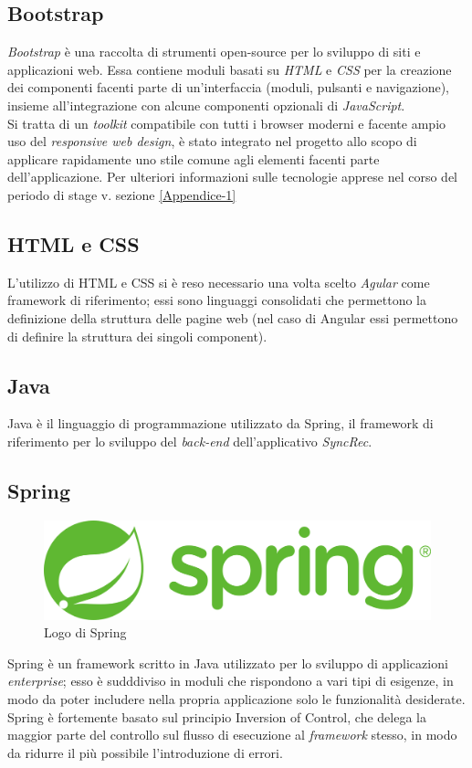 \subsection{Bootstrap}
\textit{Bootstrap} è una raccolta di strumenti \gls{open-source} per lo sviluppo di siti e applicazioni web. Essa contiene moduli basati su \textit{HTML} e \textit{CSS} per la creazione dei componenti facenti parte di un'interfaccia (moduli, pulsanti e navigazione), insieme all'integrazione con alcune componenti opzionali di \textit{JavaScript}.\\
Si tratta di un \textit{toolkit} compatibile con tutti i browser moderni e facente ampio uso del \textit{responsive web design}, è stato integrato nel progetto allo scopo di applicare rapidamente uno stile comune agli elementi facenti parte dell'applicazione.
\bigbreak
\noindent
Per ulteriori informazioni sulle tecnologie apprese nel corso del periodo di stage v. sezione \ref{Appendice-1}


\subsection{HTML e CSS}
L'utilizzo di HTML e CSS si è reso necessario una volta scelto \textit{Agular} come \gls{framework} di riferimento; essi sono linguaggi consolidati che permettono la definizione della struttura delle pagine web (nel caso di Angular essi permettono di definire la struttura dei singoli component).

\subsection{Java}
Java è il linguaggio di programmazione utilizzato da \gls{Spring}, il \gls{framework} di riferimento per lo sviluppo del \textit{back-end} dell'applicativo \textit{SyncRec}.

\subsection{Spring}
\begin{figure}[!h] 
	\centering 
	\includegraphics[width=0.4\columnwidth]{immagini/spring.png} 
	\caption{Logo di Spring}
	\label{figura:spring-1}
\end{figure}
\gls{Spring} è un framework scritto in Java utilizzato per lo sviluppo di applicazioni \textit{enterprise}; esso è sudddiviso in moduli che rispondono a vari tipi di esigenze, in modo da poter includere nella propria applicazione solo le funzionalità desiderate.\\
\gls{Spring} è fortemente basato sul principio \gls{Inversion of Control}, che delega la maggior parte del controllo sul flusso di esecuzione al \textit{framework} stesso, in modo da ridurre il più possibile l'introduzione di errori.



